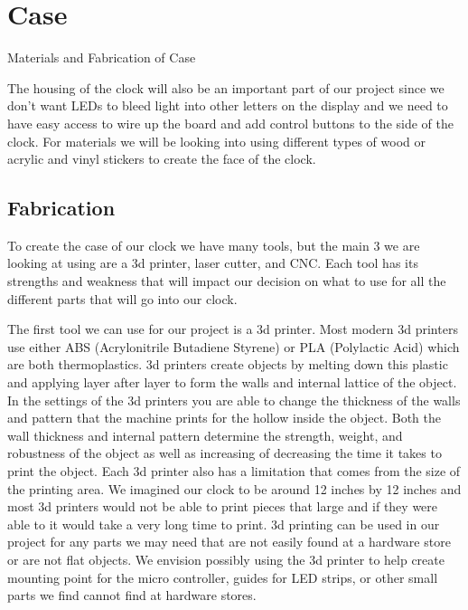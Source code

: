 \documentclass[10pt,draftclsnofoot,onecolumn]{IEEEtran}
\begin{document}
\newpage
\section{Case}
Materials and Fabrication of Case

The housing of the clock will also be an important part of our project since we don’t want LEDs to bleed light into other letters on the display and we need to have easy access to wire up the board and add control buttons to the side of the clock. For materials we will be looking into using different types of wood or acrylic and vinyl stickers to create the face of the clock.

\subsection{Fabrication}
To create the case of our clock we have many tools, but the main 3 we are looking at using are a 3d printer, laser cutter, and CNC. Each tool has its strengths and weakness that will impact our decision on what to use for all the different parts that will go into our clock. 

The first tool we can use for our project is a 3d printer. Most modern 3d printers use either ABS (Acrylonitrile Butadiene Styrene) or PLA (Polylactic Acid) which are both thermoplastics. 3d printers create objects by melting down this plastic and applying layer after layer to form the walls and internal lattice of the object. In the settings of the 3d printers you are able to change the thickness of the walls and pattern that the machine prints for the hollow inside the object. Both the wall thickness and internal pattern determine the strength, weight, and robustness of the object as well as increasing of decreasing the time it takes to print the object. Each 3d printer also has a limitation that comes from the size of the printing area. We imagined our clock to be around 12 inches by 12 inches and most 3d printers would not be able to print pieces that large and if they were able to it would take a very long time to print. 3d printing can be used in our project for any parts we may need that are not easily found at a hardware store or are not flat objects. We envision possibly using the 3d printer to help create mounting point for the micro controller, guides for LED strips, or other small parts we find cannot find at hardware stores. 
\end{document}
